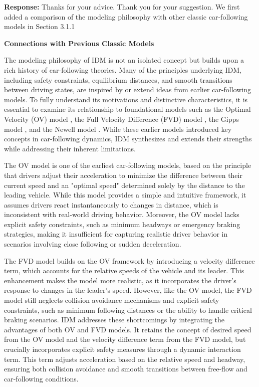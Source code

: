 \documentclass[a4paper,fleqn,11pt]{reviewresponse}
\renewenvironment{quotation}
  {\begingroup\color{customblue}%
   \captionsetup{labelfont={bf},textfont={color=customblue},font={color=customblue}}%
   \list{}{\leftmargin=0em \rightmargin=0em} %
   \item\relax\small}
  {\endlist\endgroup}
\begin{document}

\textbf{Response:} Thanks for your advice. Thank you for your suggestion. We first added a comparison of the modeling philosophy with other classic car-following models in Section 3.1.1

\begin{quotation}\noindent
\textbf{Connections with Previous Classic Models} 

The modeling philosophy of IDM is not an isolated concept but builds upon a rich history of car-following theories. Many of the principles underlying IDM, including safety constraints, equilibrium distances, and smooth transitions between driving states, are inspired by or extend ideas from earlier car-following models. To fully understand its motivations and distinctive characteristics, it is essential to examine its relationship to foundational models such as the Optimal Velocity (OV) model \citep{bandoDynamicalModelTrafficCongestion1995a}, the Full Velocity Difference (FVD) model \citep{jiangFullVelocityDifferenceModel2001a}, the Gipps model \citep{gippsBehaviouralCarfollowingModelComputer1981a}, and the Newell model \citep{newellNonlinearEffectsDynamicsCar1961a}. While these earlier models introduced key concepts in car-following dynamics, IDM synthesizes and extends their strengths while addressing their inherent limitations.

The OV model is one of the earliest car-following models, based on the principle that drivers adjust their acceleration to minimize the difference between their current speed and an "optimal speed" determined solely by the distance to the leading vehicle. While this model provides a simple and intuitive framework, it assumes drivers react instantaneously to changes in distance, which is inconsistent with real-world driving behavior. Moreover, the OV model lacks explicit safety constraints, such as minimum headways or emergency braking strategies, making it insufficient for capturing realistic driver behavior in scenarios involving close following or sudden deceleration.

The FVD model builds on the OV framework by introducing a velocity difference term, which accounts for the relative speeds of the vehicle and its leader. This enhancement makes the model more realistic, as it incorporates the driver’s response to changes in the leader’s speed. However, like the OV model, the FVD model still neglects collision avoidance mechanisms and explicit safety constraints, such as minimum following distances or the ability to handle critical braking scenarios. IDM addresses these shortcomings by integrating the advantages of both OV and FVD models. It retains the concept of desired speed from the OV model and the velocity difference term from the FVD model, but crucially incorporates explicit safety measures through a dynamic interaction term. This term adjusts acceleration based on the relative speed and headway, ensuring both collision avoidance and smooth transitions between free-flow and car-following conditions.


\end{quotation}
\end{document}
